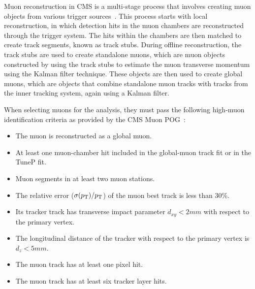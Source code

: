 Muon reconstruction in CMS is a multi-stage process that involves creating muon objects from various trigger sources~\cite{Sirunyan_2018_CMS,Sirunyan_2020}. %
This process starts with local reconstruction, in which detection hits in the muon chambers are reconstructed through the trigger system.
The hits within the chambers are then matched to create track segments, known as track stubs.
During offline reconstruction, the track stubs are used to create standalone muons, which are muon objects constructed by using the track stubs to estimate the muon transverse momentum using the Kalman filter technique.
These objects are then used to create global muons, which are objects that combine standalone muon tracks with tracks from the inner tracking system, again using a Kalman filter.

When selecting muons for the analysis, they must pass the following high-\pt muon identification criteria as provided by the CMS Muon POG~\cite{Sirunyan_2020}:
\begin{itemize}
  \item The muon is reconstructed as a global muon.
  \item At least one muon-chamber hit included in the global-muon track fit or in the TuneP fit.
  \item Muon segments in at least two muon stations.
  \item The \pt relative error ($\sigma(p_\mathrm{T})/p_\mathrm{T}$) of the muon best track is less than 30\%.
  \item Its tracker track has transverse impact parameter $d_{xy}<2\unit{mm}$ with respect to the primary vertex.
  \item The longitudinal distance of the tracker with respect to the primary vertex is $d_z<5\unit{mm}$.
  \item The muon track has at least one pixel hit.
  \item The muon track has at least six tracker layer hits.
\end{itemize}

